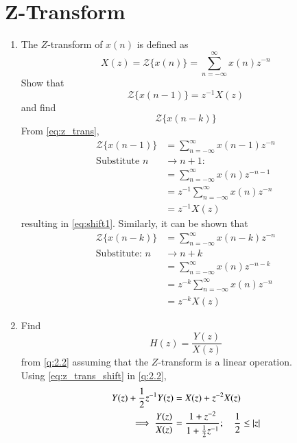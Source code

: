 \documentclass[journal,12pt,twocolumn]{IEEEtran}
\theoremstyle{remark}
\renewcommand\thesection{\arabic{section}}
\numberwithin{equation}{subsection}
\begin{document}
\section{Z-Transform}

\begin{enumerate}[label=\thesection.\arabic*]
\item The $Z$-transform of $x(n)$ is defined as
%
\begin{equation}
\label{eq:z_trans}
X(z)={\mathcal {Z}}\{x(n)\}=\sum _{n=-\infty }^{\infty }x(n)z^{-n}
\end{equation}
%
Show that
\begin{equation}
\label{eq:shift1}
{\mathcal {Z}}\{x(n-1)\} = z^{-1}X(z)
\end{equation}
and find
\begin{equation}
	{\mathcal {Z}}\{x(n-k)\} 
\end{equation}
\solution From \eqref{eq:z_trans},
\begin{align}
{\mathcal {Z}}\{x(n-1)\} &=\sum _{n=-\infty }^{\infty }x(n-1)z^{-n}\\
\text{Substitute }n &\rightarrow n+1:\\ \nonumber
&=\sum _{n=-\infty }^{\infty }x(n)z^{-n-1} \\
&= z^{-1}\sum _{n=-\infty }^{\infty }x(n)z^{-n}\\
&= z^{-1}X(z)
\end{align}
resulting in \eqref{eq:shift1}. Similarly, it can be shown that
%
\begin{align}
{\mathcal {Z}}\{x(n-k)\} &=\sum _{n=-\infty }^{\infty }x(n-k)z^{-n}\\
\text{Substitute: }n &\rightarrow n+k \nonumber\\
&=\sum _{n=-\infty }^{\infty }x(n)z^{-n-k} \\
&= z^{-k}\sum _{n=-\infty }^{\infty }x(n)z^{-n}\\
&= z^{-k}X(z) \label{eq:z_trans_shift}
\end{align}
\item Find
%
\begin{equation}
H(z) = \frac{Y(z)}{X(z)}
\end{equation}
from  \eqref{q:2.2} assuming that the $Z$-transform is a linear operation.
\\
\solution  Using \eqref{eq:z_trans_shift} in \eqref{q:2.2},
\begin{align}
Y(z) + \frac{1}{2}z^{-1}Y(z) &= X(z)+z^{-2}X(z)
\\
\implies \frac{Y(z)}{X(z)} &= \frac{1 + z^{-2}}{1 + \frac{1}{2}z^{-1}}; \quad \frac{1}{2} \leq \abs{z}

\end{align}
\end{enumerate}
\end{document}
